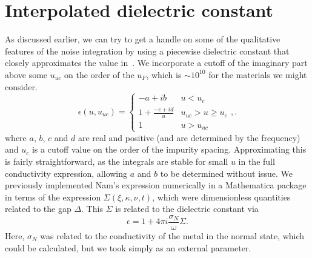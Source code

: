 \documentclass[11pt]{article}
\begin{document}
	\graphicspath{{figures/}}

	\section{Interpolated dielectric constant} \label{sec:intro}

	As discussed earlier, we can try to get a handle on some of the qualitative features of the noise integration by using a piecewise dielectric constant that closely approximates the value in~\cite{Nam1967}.
	We incorporate a cutoff of the imaginary part above some $u_{uc}$ on the order of the $u_F$, which is $\sim 10^{10}$ for the materials we might consider.
	\begin{equation}
		\epsilon(u, u_{uc}) =
		\begin{cases}
			-a + i b & u < u_c \\
			1 + \frac{-c + i d}{u} &  u_{uc} > u \geq u_c \\
			1 & u > u_{uc}
		\end{cases}, \label{eq:eps}.
	\end{equation}
	where $a$, $b$, $c$ and $d$ are real and positive (and are determined by the frequency) and $u_c$ is a cutoff value on the order of the impurity spacing.
	Approximating this is fairly straightforward, as the integrals are stable for small $u$ in the full conductivity expression, allowing $a$ and $b$ to be determined without issue.
	We previously implemented Nam's expression numerically in a Mathematica package in terms of the expression $\Sigma(\xi, \kappa, \nu, t)$, which were dimensionless quantities related to the gap $\Delta$.
	This $\Sigma$ is related to the dielectric constant via
	\begin{equation}
		\epsilon = 1 + 4 \pi i \frac{\sigma_N}{\omega} \Sigma.
	\end{equation}
	Here, $\sigma_N$ was related to the conductivity of the metal in the normal state, which could be calculated, but we took simply as an external parameter.
\end{document}
